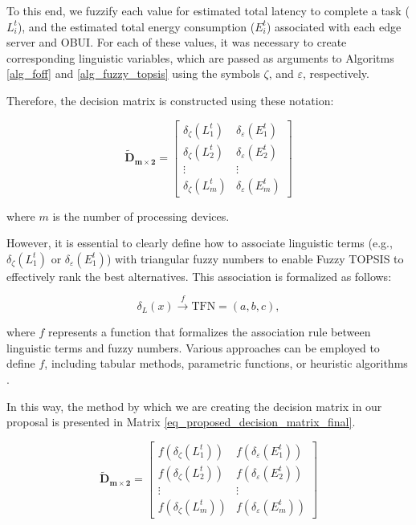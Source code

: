 \documentclass[iicol]{sn-jnl}
\begin{document}
To this end, we fuzzify each value for estimated total latency to complete a task ($L^t_i$), and the estimated total energy consumption ($E^t_i$) associated with each edge server and OBUI. For each of these values, it was necessary to create corresponding linguistic variables, which are passed as arguments to Algoritms \ref{alg_foff} and \ref{alg_fuzzy_topsis} using the symbols $\zeta$, and $\varepsilon$, respectively.

Therefore, the decision matrix is constructed using these notation:

\begin{equation}
    \label{eq_proposed_decision_matrix}
    \mathbf{\tilde{D}_{m\times2}} = 
    \begin{bmatrix}
    \delta_\zeta(L^t_1) & \delta_\varepsilon(E^t_1) \\
    \delta_\zeta(L^t_2) & \delta_\varepsilon(E^t_2) \\
    \vdots & \vdots \\
    \delta_\zeta(L^t_m) & \delta_\varepsilon(E^t_m)
    \end{bmatrix}
\end{equation}

where $m$ is the number of processing devices.

However, it is essential to clearly define how to associate linguistic terms (e.g., $\delta_\zeta(L^t_1)$ or $\delta_\varepsilon(E^t_1)$) with triangular fuzzy numbers to enable Fuzzy TOPSIS to effectively rank the best alternatives. This association is formalized as follows:

\begin{equation}
    \label{eq_lt_to_tfn}
    \delta_L(x) \xrightarrow{f} \text{TFN} = (a, b, c),
\end{equation}

where $f$ represents a function that formalizes the association rule between linguistic terms and fuzzy numbers. Various approaches can be employed to define $f$, including tabular methods, parametric functions, or heuristic algorithms \cite{kahraman2008fuzzy}.

In this way, the method by which we are creating the decision matrix in our proposal is presented in Matrix \eqref{eq_proposed_decision_matrix_final}.

\begin{equation}
    \label{eq_proposed_decision_matrix_final}
    \mathbf{\tilde{D}_{m\times2}} = 
    \begin{bmatrix}
    f(\delta_\zeta(L^t_1)) & f(\delta_\varepsilon(E^t_1)) \\
    f(\delta_\zeta(L^t_2)) & f(\delta_\varepsilon(E^t_2)) \\
    \vdots & \vdots  \\
    f(\delta_\zeta(L^t_m)) & f(\delta_\varepsilon(E^t_m))
    \end{bmatrix}
\end{equation}
\end{document}

